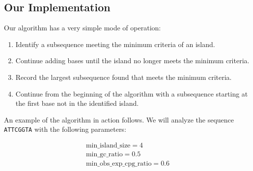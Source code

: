 \documentclass{bioinfo}
\newcommand{\dnaseq}[1]{\texttt{#1}}
\begin{document}
\subsection{Our Implementation}

Our algorithm has a very simple mode of operation:

\begin{enumerate}
\item Identify a subsequence meeting the minimum criteria of an island.
\item Continue adding bases until the island no longer meets the
  minimum criteria.
\item Record the largest subsequence found that meets the minimum criteria.
\item Continue from the beginning of the algorithm with a subsequence
  starting at the first base not in the identified island.
\end{enumerate}

An example of the algorithm in action follows. We will analyze the
sequence \dnaseq{ATTCGGTA} with the following parameters:

\begin{eqnarray*}
  \mbox{min\_island\_size} = 4 \\
  \mbox{min\_gc\_ratio} = 0.5 \\
  \mbox{min\_obs\_exp\_cpg\_ratio} = 0.6 \\
\end{eqnarray*}
\end{document}
